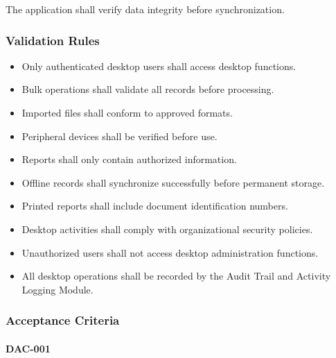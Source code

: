 The application shall verify data integrity before synchronization.


\subsubsection*{Validation Rules}

\begin{itemize}

\item Only authenticated desktop users shall access desktop functions.

\item Bulk operations shall validate all records before processing.

\item Imported files shall conform to approved formats.

\item Peripheral devices shall be verified before use.

\item Reports shall only contain authorized information.

\item Offline records shall synchronize successfully before permanent
storage.

\item Printed reports shall include document identification numbers.

\item Desktop activities shall comply with organizational security
policies.

\item Unauthorized users shall not access desktop administration
functions.

\item All desktop operations shall be recorded by the Audit Trail and
Activity Logging Module.

\end{itemize}


\subsubsection*{Acceptance Criteria}

\paragraph{DAC-001}

